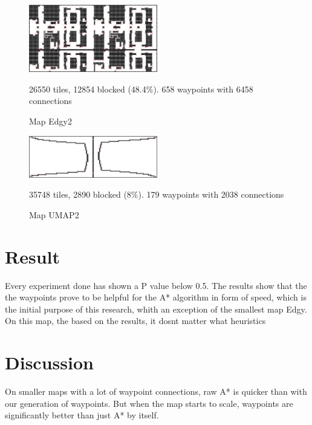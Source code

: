 \documentclass[a4paper]{article}
\begin{document}
\begin{figure}[t!]
\centering
\includegraphics[width=0.5\textwidth,height=\textheight,keepaspectratio]{Data/Edgy2.png}
\caption{Map Edgy2}
26550 tiles, 12854 blocked (48.4\%). 658 waypoints with 6458 connections
\label{fig:Edgy2}
\end{figure}

\begin{figure}[t!]
\centering
\includegraphics[width=0.5\textwidth,height=\textheight,keepaspectratio]{Data/UMAP2.png}
\caption{Map UMAP2}
35748 tiles, 2890 blocked (8\%). 179 waypoints with 2038 connections
\label{fig:UMAP2}
\end{figure}





\section{Result}
Every experiment done has shown a P value below 0.5. The results show that the the waypoints prove to be helpful for the A* algorithm in form of speed, which is the initial purpose of this research, whith an exception of the smallest map Edgy.
On this map, the based on the results, it dosnt matter what heuristics 


\section{Discussion}
On smaller maps with a lot of waypoint connections, raw A* is quicker than with our generation of waypoints. But when the map starts to scale, waypoints are significantly better than just A* by itself.
\end{document}
